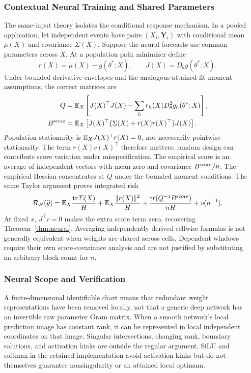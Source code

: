 \subsubsection{Contextual Neural Training and Shared Parameters}
\label{app:context}
The same-input theory isolates the conditional response mechanism. In a pooled application, let independent events have pairs $(X_i,\mathbf Y_i)$ with conditional mean $\mu(X)$ and covariance $\Sigma(X)$. Suppose the neural forecasts use common parameters across $X$. At a population path minimizer define
\[
 r(X)=\mu(X)-g(\theta^*;X),\qquad J(X)=D_\theta g(\theta^*;X).
\]
Under bounded derivative envelopes and the analogous attained-fit moment assumptions, the correct matrices are
\begin{align*}
 Q&=\mathbb E_X\left[J(X)^\top J(X)-\sum_h r_h(X)D^2_\theta g_h(\theta^*;X)\right],\\
 B^{\rm score}&=\mathbb E_X\left[J(X)^\top
        \{\Sigma(X)+r(X)r(X)^\top\}J(X)\right].
\end{align*}
Population stationarity is $\mathbb E_XJ(X)^\top r(X)=0$, not necessarily pointwise stationarity. The term $r(X)r(X)^\top$ therefore matters: random design can contribute score variation under misspecification. The empirical score is an average of independent vectors with mean zero and covariance $B^{\rm score}/n$. The empirical Hessian concentrates at $Q$ under the bounded moment conditions. The same Taylor argument proves integrated risk
\[
 \mathcal R_H(\widehat g)=\mathbb E_X\frac{\operatorname{tr}\Sigma(X)}H
   +\mathbb E_X\frac{\|r(X)\|^2}H
   +\frac{\operatorname{tr}(Q^{-1}B^{\rm score})}{nH}+o(n^{-1}).
\]
At fixed $x$, $J^\top r=0$ makes the extra score term zero, recovering Theorem~\ref{thm:neural}. Averaging independently derived cellwise formulas is not generally equivalent when weights are shared across cells. Dependent windows require their own score-covariance analysis and are not justified by substituting an arbitrary block count for $n$.

\subsubsection{Neural Scope and Verification}
A finite-dimensional identifiable chart means that redundant weight representations have been removed locally, not that a generic deep network has an invertible raw parameter Gram matrix. When a smooth network's local prediction image has constant rank, it can be represented in local independent coordinates on that image. Singular intersections, changing rank, boundary solutions, and activation kinks are outside the regular argument. SiLU and softmax in the retained implementation avoid activation kinks but do not themselves guarantee nonsingularity or an attained local optimum.

